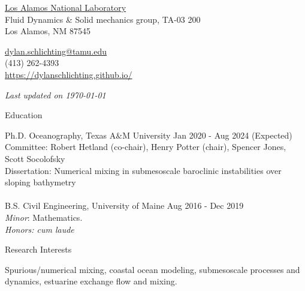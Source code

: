 \documentclass{resume} %
\newcommand{\updateinfo}[1][\today]{\par\vfill{\textit{Last updated on #1}}}
\begin{document}
\begin{minipage}[ht]{0.35\textwidth}
  \href{https://www.lanl.gov/org/ddste/aldsc/theoretical/fluid-dynamics-solid-mechanics/index.php}{Los Alamos National Laboratory} \\
  Fluid Dynamics \& Solid mechanics group,
  TA-03 200  \\
  Los Alamos, NM 87545
\end{minipage}
\begin{minipage}[ht]{0.6\textwidth}
  \href{mailto:dylan.schlichting@tamu.edu}{dylan.schlichting@tamu.edu} \\
  (413) 262-4393\\
  \url{https://dylanschlichting.github.io/}
  \updateinfo
\end{minipage}
\vspace{-65 pt}

\vspace{60pt}
\begin{rSection}{Education}

Ph.D. Oceanography, Texas A$\&$M 
University \hfill {Jan 2020 - Aug 2024 (Expected)
}
\\
Committee: Robert Hetland (co-chair), Henry Potter (chair), Spencer Jones, Scott Socolofsky
\\
Dissertation: Numerical mixing in submesoscale baroclinic instabilities over sloping bathymetry 
\\
\\
B.S. Civil Engineering, University of Maine \hfill {Aug 2016 - Dec 2019}
\\ 
{\textit{Minor}:} Mathematics.  \\ \textit{Honors: cum laude}
\end{rSection}

\begin{rSection}{Research Interests}
\vspace{-10pt}
\item Spurious/numerical mixing, coastal ocean modeling, submesoscale processes and dynamics, estuarine exchange flow and mixing.

\end{rSection}
\end{document}
